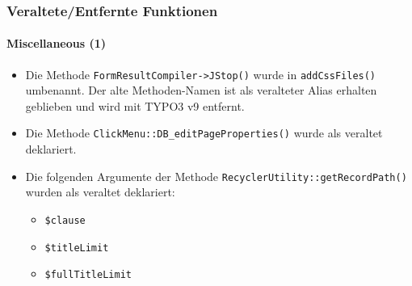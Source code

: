\begin{frame}[fragile]
	\frametitle{Veraltete/Entfernte Funktionen}
	\framesubtitle{Miscellaneous (1)}

	\begin{itemize}
		\item Die Methode \texttt{FormResultCompiler->JStop()} wurde in \texttt{addCssFiles()} umbenannt.
			Der alte Methoden-Namen ist als veralteter Alias erhalten geblieben und wird mit TYPO3 v9 entfernt.

		\item Die Methode \texttt{ClickMenu::DB\_editPageProperties()} wurde als veraltet deklariert.

		\item Die folgenden Argumente der Methode \texttt{RecyclerUtility::getRecordPath()} wurden als veraltet deklariert:

			\begin{itemize}
				\item \texttt{\$clause}
				\item \texttt{\$titleLimit}
				\item \texttt{\$fullTitleLimit}
			\end{itemize}

	\end{itemize}

\end{frame}


